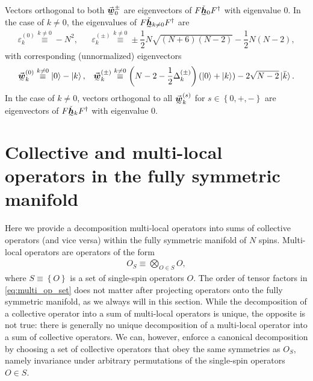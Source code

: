 \documentclass[nofootinbib,notitlepage,11pt]{revtex4-2}
\newcommand{\f}[2]{\dfrac{#1}{#2}} %
\newcommand{\p}[1]{\left(#1\right)} %
\renewcommand{\set}[1]{\left\{#1\right\}} %
\newcommand{\m}{\bm} %
\renewcommand{\v}{\vec} %
\newcommand{\1}{\mathds{1}}
\newcommand{\ut}{\undertilde}
\begin{document}
Vectors orthogonal to both $\ut{\v{\m w}}_0^\pm$ are eigenvectors of
$F \ut{\check{\m h}}_0 F^\dag$ with eigenvalue 0.  In the case of
$k\ne0$, the eigenvalues of $F \ut{\check{\m h}}_{k\ne0} F^\dag$ are
\begin{align}
  \varepsilon_k^{(0)} \stackrel{k\ne0}{\equiv} -N^2,
  &&
  \varepsilon_k^{(\pm)}
  \stackrel{k\ne0}{\equiv}
  \pm \f12 N \sqrt{\p{N+6}\p{N-2}} - \f12 N \p{N-2},
\end{align}
with corresponding (unnormalized) eigenvectors
\begin{align}
  \ut{\v{\m w}}_k^{(0)}
  \stackrel{k\ne0}{\equiv} \ket{0} - \ket{k},
  &&
  \ut{\v{\m w}}_k^{(\pm)}
  \stackrel{k\ne0}{\equiv}
  \p{N - 2 - \f12\Delta_k^{(\pm)}} \p{\ket{0}+\ket{k}}
  - 2 \sqrt{N-2}\ket{\bar{k}}.
\end{align}
In the case of $k\ne0$, vectors orthogonal to all
$\ut{\v{\m w}}_k^{(s)}$ for $s\in\set{0,+,-}$ are eigenvectors of
$F \ut{\check{\m h}}_k F^\dag$ with eigenvalue 0.




\section{Collective and multi-local operators in the fully symmetric
  manifold}
\label{sec:multi_to_collective}

Here we provide a decomposition multi-local operators into sums of
collective operators (and vice versa) within the fully symmetric
manifold of $N$ spins.  Multi-local operators are operators of the
form
\begin{align}
  O_S \equiv \bigotimes_{O\in S} O,
  \label{eq:multi_op_set}
\end{align}
where $S\equiv\set{O}$ is a set of single-spin operators $O$.  The
order of tensor factors in \eqref{eq:multi_op_set} does not matter
after projecting operators onto the fully symmetric manifold, as we
always will in this section.  While the decomposition of a collective
operator into a sum of multi-local operators is unique, the opposite
is not true: there is generally no unique decomposition of a
multi-local operator into a sum of collective operators.  We can,
however, enforce a canonical decomposition by choosing a set of
collective operators that obey the same symmetries as $O_S$, namely
invariance under arbitrary permutations of the single-spin operators
$O\in S$.
\end{document}
